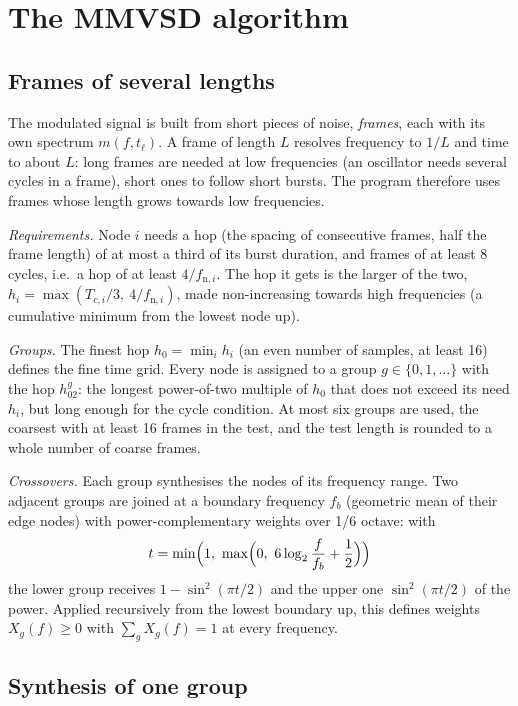 \section{The MMVSD algorithm}\label{sec:mmvsdalg}

\subsection{Frames of several lengths}\label{sec:frames}

The modulated signal is built from short pieces of noise, \emph{frames}, each with its own spectrum
$m(f,t_\ell)$. A frame of length $L$ resolves frequency to $1/L$ and time to about $L$: long frames
are needed at low frequencies (an oscillator needs several cycles in a frame), short ones to follow
short bursts. The program therefore uses frames whose length grows towards low frequencies.

\emph{Requirements.} Node $i$ needs a hop (the spacing of consecutive frames, half the frame length)
of at most a third of its burst duration, and frames of at least 8 cycles, i.e.\ a hop of at least
$4/f_{\mathrm{n},i}$. The hop it gets is the larger of the two, $h_i = \max(T_{c,i}/3,\
4/f_{\mathrm{n},i})$, made non-increasing towards high frequencies (a cumulative minimum from the
lowest node up).

\emph{Groups.} The finest hop $h_0 = \min_ih_i$ (an even number of samples, at least 16) defines the
fine time grid. Every node is assigned to a group $g\in\{0,1,\dots\}$ with the hop $h_02^{g}$: the
longest power-of-two multiple of $h_0$ that does not exceed its need $h_i$, but long enough for the
cycle condition. At most six groups are used, the coarsest with at least 16 frames in the test, and the
test length is rounded to a whole number of coarse frames.

\emph{Crossovers.} Each group synthesises the nodes of its frequency range. Two adjacent groups are
joined at a boundary frequency $f_b$ (geometric mean of their edge nodes) with power-complementary
weights over 1/6 octave: with
\begin{equation*}
  t = \min\Bigl(1,\ \max\Bigl(0,\ 6\log_2\frac{f}{f_b} + \frac12\Bigr)\Bigr)
\end{equation*}
the lower group receives $1-\sin^2(\pi t/2)$ and the upper one $\sin^2(\pi t/2)$ of the power. Applied
recursively from the lowest boundary up, this defines weights $X_g(f)\ge0$ with $\sum_gX_g(f) = 1$
at every frequency.

\subsection{Synthesis of one group}

